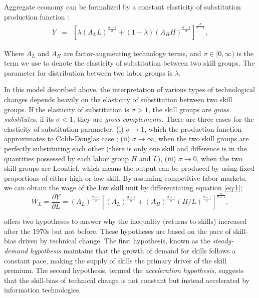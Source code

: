 \begin{onehalfspace}
Aggregate economy can be formalized by a constant elasticity of substitution
production function \citep{Acemoglu2011}:
\begin{eqnarray}
Y & = & \left[\lambda(A_{L}L)^{\tfrac{\sigma-1}{\sigma}}+(1-\lambda)(A_{H}H)^{\tfrac{\sigma-1}{\sigma}}\right]^{\tfrac{\sigma}{\sigma-1}},\label{eq:1}
\end{eqnarray}

Where \emph{$A_L$ }and\emph{ $A_H$ }are factor-augmenting technology
terms, and $\sigma\in[0,\infty)$ is the term we use to denote the
elasticity of substitution between two skill groups. The parameter
for distribution between two labor groups is $\lambda$.

In this model described above, the interpretation of various types
of technological changes depends heavily on the elasticity of substitution
between two skill groups. If the elasticity of substitution is $\sigma>1$,
the skill groups are \emph{gross substitute}s, if its $\sigma<1$,
they are \emph{gross complements. }There are three cases for the elasticity
of substitution parameter: (i) $\sigma\rightarrow1$, which the production
function approximates to Cobb-Douglas case \citep{Acemoglu2011};
(ii) $\sigma\rightarrow\infty$, when the two skill groups are perfectly
substituting each other (there is only one skill and difference is
in the quantities possessed by each labor group $H$ and $L$), (iii)
$\sigma\rightarrow0$, when the two skill groups are Leontief, which
means the output can be produced by using fixed proportions of either
high or low skill. By assuming competitive labor markets, we can obtain
the wage of the low skill unit by differentiating equation \ref{eq:1};
\begin{equation}
W_{L}=\dfrac{\partial Y}{\partial L}=(A_{L})^{\tfrac{\sigma-1}{\sigma}}\left[(A_{L})^{\tfrac{\sigma-1}{\sigma}}+(A_{H})^{\tfrac{\sigma-1}{\sigma}}(H/L)^{\tfrac{\sigma-1}{\sigma}}\right]^{\tfrac{\sigma}{\sigma-1}},\label{eq:2}
\end{equation}

\citet{2002Acemoglu} offers two hypotheses to answer why the inequality
(returns to skills) increased after the 1970s but not before. These
hypotheses are based on the pace of skill-bias driven by technical
change. The first hypothesis, known as the \emph{steady-demand hypothesis}
maintains that the growth of demand for skills follows a constant
pace, making the supply of skills the primary driver of the skill
premium. The second hypothesis, termed the\emph{ acceleration hypothesis,
}suggests that the skill-bias of technical change is not constant
but instead accelerated by information technologies.


\end{onehalfspace}
